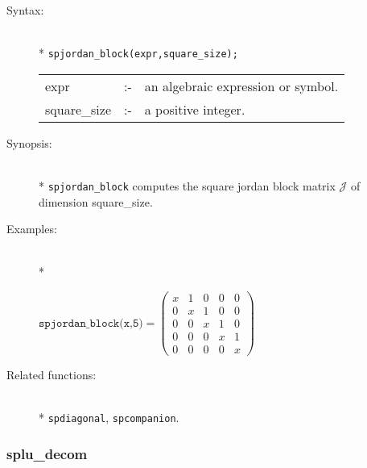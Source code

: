 \begin{description}
\item[Syntax:]\mbox{}\\*
 \texttt{spjordan\_block(expr,square\_size);}\\[2mm]
\begin{tabular}{l l l}
expr        &:-& an algebraic expression or symbol. \\
square\_size &:-& a positive integer.
\end{tabular}

\item[Synopsis:]\mbox{}\\*
\texttt{spjordan\_block} computes the square jordan block matrix $\mathcal{J}$
                of dimension square\_size. 

\item[Examples:]\mbox{}\\*
\begin{flushleft}  
\begin{math}        
\texttt{spjordan\_block(x,5)} = 
\begin{pmatrix} x & 1 & 0 & 0 & 0 \\ 0 & x & 1 & 0 & 0 \\ 0 
& 0 & x & 1 & 0 \\ 0 & 0 & 0 & x & 1 \\ 0 & 0 & 0 & 0 & x
\end{pmatrix} 
\end{math}  
\end{flushleft}

\item[Related functions:]\mbox{}\\*
 \texttt{spdiagonal}, \texttt{spcompanion}.
\end{description}

\subsubsection{splu\_decom}
\label{sparse:splu_decom}

